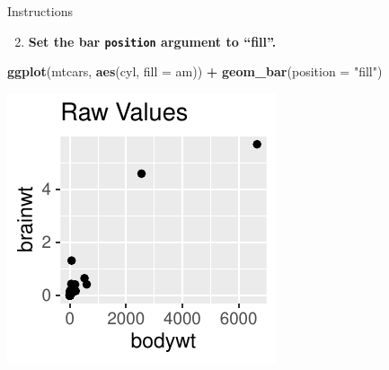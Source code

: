 \documentclass[
  ignorenonframetext,
]{beamer}
\newenvironment{Shaded}{\begin{snugshade}}{\end{snugshade}}
\newcommand{\AttributeTok}[1]{\textcolor[rgb]{0.13,0.29,0.53}{#1}}
\newcommand{\FunctionTok}[1]{\textcolor[rgb]{0.13,0.29,0.53}{\textbf{#1}}}
\newcommand{\NormalTok}[1]{#1}
\newcommand{\SpecialCharTok}[1]{\textcolor[rgb]{0.81,0.36,0.00}{\textbf{#1}}}
\newcommand{\StringTok}[1]{\textcolor[rgb]{0.31,0.60,0.02}{#1}}
\providecommand{\tightlist}{%
  \setlength{\itemsep}{0pt}\setlength{\parskip}{0pt}}
\begin{document}
\begin{frame}[fragile]{Instructions}
\label{instructions-4}
\begin{enumerate}
\setcounter{enumi}{1}
\tightlist
\item
  \textbf{Set the bar \texttt{position} argument to ``fill''.}
\end{enumerate}


\begin{Shaded}
\begin{Highlighting}[]
\FunctionTok{ggplot}\NormalTok{(mtcars, }\FunctionTok{aes}\NormalTok{(cyl, }\AttributeTok{fill =}\NormalTok{ am)) }\SpecialCharTok{+} \FunctionTok{geom\_bar}\NormalTok{(}\AttributeTok{position =} \StringTok{"fill"}\NormalTok{)}
\end{Highlighting}
\end{Shaded}

\begin{center}\includegraphics[width=0.5\linewidth]{Figs/unnamed-chunk-48-1} \end{center}
\end{frame}
\end{document}
